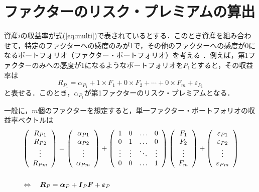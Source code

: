\documentclass[11pt]{jreport}
\begin{document}
\section{ファクターのリスク・プレミアムの算出}
資産$i$の収益率が式(\ref{eq:multi})で表されているとする．このとき資産を組み合わせて，特定のファクターへの感度のみが1で，その他のファクターへの感度が0になるポートフォリオ（ファクター・ポートフォリオ）を考える ．例えば，第1ファクターのみへの感度が1になるようなポートフォリオを$P_1$とすると，その収益率は
\begin{equation}
R_{P_1} = \alpha_{P_1} + 1\times F_1 + 0\times F_2 + \cdots + 0\times F_m + \varepsilon_{P_1} 
\end{equation}
と表せる．このとき，$\alpha_{P_1}$が第1ファクターのリスク・プレミアムとなる．

一般に，$m$個のファクターを想定すると，単一ファクター・ポートフォリオの収益率ベクトルは
\begin{eqnarray}
& \left(
	\begin{array}{cccc}
	R_{P1}\\
	R_{P2}\\
	\vdots \\
	R_{Pm}
	\end{array}
\right)
=
\left(
	\begin{array}{cccc}
	\alpha_{P1}\\
	\alpha_{P2}\\
	\vdots \\
	\alpha_{Pm}
	\end{array}
\right)
+
\left(
	\begin{array}{cccc}
	1 & 0 & \ldots & 0\\
	0 & 1 & \ldots & 0\\
	\vdots & \vdots & \ddots & \vdots \\
	0 & 0 & \ldots & 1
	\end{array}
\right)
\left(
	\begin{array}{cccc}
	F_1 \\
	F_2 \\
	\vdots \\
	F_m
	\end{array}
\right)
+
\left(
	\begin{array}{cccc}
	\varepsilon_{P1}\\
	\varepsilon_{P2}\\
	\vdots \\
	\varepsilon_{Pm}\\
	\end{array}
\right)\\
\notag \\
& \Leftrightarrow \quad \mbox{\boldmath $R$}_P = \mbox{\boldmath $\alpha$}_P + \mbox{\boldmath $I$}_P\mbox{\boldmath $F$} + \mbox{\boldmath $\varepsilon$}_P
\end{eqnarray}
\end{document}
